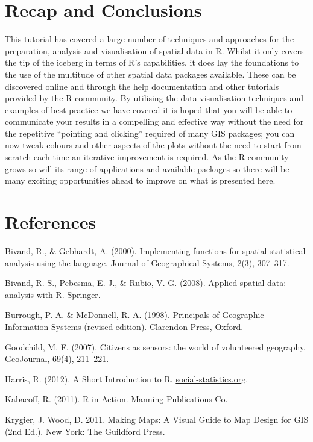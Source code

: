 \documentclass[]{article}
\begin{document}
\section{Recap and Conclusions}

This tutorial has covered a large number of techniques and approaches
for the preparation, analysis and visualisation of spatial data in R.
Whilst it only covers the tip of the iceberg in terms of R's
capabilities, it does lay the foundations to the use of the multitude of
other spatial data packages available. These can be discovered online
and through the help documentation and other tutorials provided by the R
community. By utilising the data visualisation techniques and examples
of best practice we have covered it is hoped that you will be able to
communicate your results in a compelling and effective way without the
need for the repetitive ``pointing and clicking'' required of many GIS
packages; you can now tweak colours and other aspects of the plots
without the need to start from scratch each time an iterative
improvement is required. As the R community grows so will its range of
applications and available packages so there will be many exciting
opportunities ahead to improve on what is presented here.

\newpage \section{References}

Bivand, R., \& Gebhardt, A. (2000). Implementing functions for spatial
statistical analysis using the language. Journal of Geographical
Systems, 2(3), 307--317.

Bivand, R. S., Pebesma, E. J., \& Rubio, V. G. (2008). Applied spatial
data: analysis with R. Springer.

Burrough, P. A. \& McDonnell, R. A. (1998). Principals of Geographic
Information Systems (revised edition). Clarendon Press, Oxford.

Goodchild, M. F. (2007). Citizens as sensors: the world of volunteered
geography. GeoJournal, 69(4), 211--221.

Harris, R. (2012). A Short Introduction to R.
\href{http://www.social-statistics.org/}{social-statistics.org}.

Kabacoff, R. (2011). R in Action. Manning Publications Co.

Krygier, J. Wood, D. 2011. Making Maps: A Visual Guide to Map Design for
GIS (2nd Ed.). New York: The Guildford Press.
\end{document}
